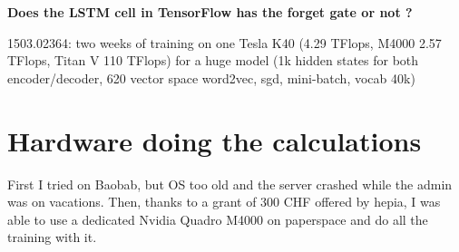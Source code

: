 \textbf{Does the LSTM cell in TensorFlow has the forget gate or not ?}

1503.02364: two weeks of training on one Tesla K40 (4.29 TFlops, M4000 2.57 TFlops, Titan V 110 TFlops) for a huge model (1k hidden states for both encoder/decoder, 620 vector space word2vec, sgd, mini-batch, vocab 40k)

\section{Hardware doing the calculations}
First I tried on Baobab, but OS too old and the server crashed while the admin was on vacations. Then, thanks to a grant of 300 CHF offered by hepia, I was able to use a dedicated Nvidia Quadro M4000 on paperspace and do all the training with it.
